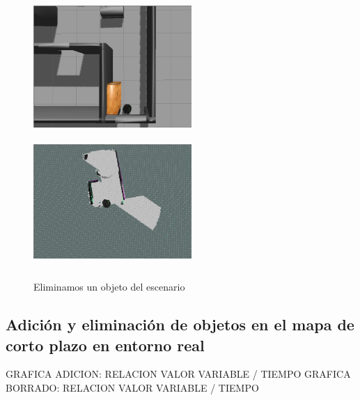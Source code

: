 \begin{figure}[hbtp]
  \begin{center}
    \includegraphics[width=6cm,height=5cm]{img/cap7/incrementmap2}
    \includegraphics[width=6cm,height=5cm]{img/cap7/incrementmap-object2}
  \end{center}
  \caption{Eliminamos un objeto del escenario}
  \label{fig:deleteobject}
\end{figure}

\subsection {Adición y eliminación de objetos en el mapa de corto plazo en entorno real}
\label{sec:add-deleteobjectsreal}

GRAFICA ADICION: RELACION VALOR VARIABLE / TIEMPO
GRAFICA BORRADO: RELACION VALOR VARIABLE / TIEMPO

